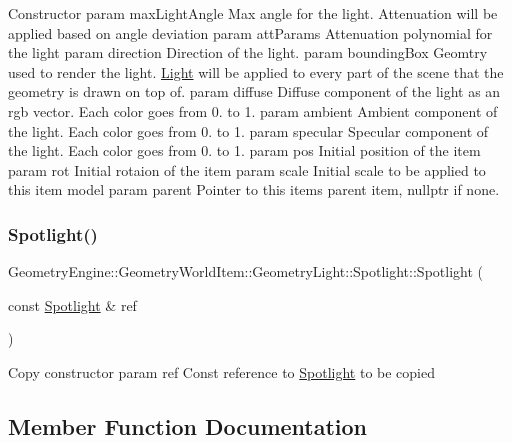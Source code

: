 Constructor param max\+Light\+Angle Max angle for the light. Attenuation will be applied based on angle deviation param att\+Params Attenuation polynomial for the light param direction Direction of the light. param bounding\+Box Geomtry used to render the light. \mbox{\hyperlink{class_geometry_engine_1_1_geometry_world_item_1_1_geometry_light_1_1_light}{Light}} will be applied to every part of the scene that the geometry is drawn on top of. param diffuse Diffuse component of the light as an rgb vector. Each color goes from 0. to 1. param ambient Ambient component of the light. Each color goes from 0. to 1. param specular Specular component of the light. Each color goes from 0. to 1. param pos Initial position of the item param rot Initial rotaion of the item param scale Initial scale to be applied to this item model param parent Pointer to this items parent item, nullptr if none. \mbox{\label{class_geometry_engine_1_1_geometry_world_item_1_1_geometry_light_1_1_spotlight_a9d503c8da14980a0e7df3c9c0edde42c}} 
\subsubsection{\texorpdfstring{Spotlight()}{Spotlight()}\hspace{0.1cm}{\footnotesize\ttfamily [2/2]}}
{\footnotesize\ttfamily Geometry\+Engine\+::\+Geometry\+World\+Item\+::\+Geometry\+Light\+::\+Spotlight\+::\+Spotlight (\begin{DoxyParamCaption}\item[{const \mbox{\hyperlink{class_geometry_engine_1_1_geometry_world_item_1_1_geometry_light_1_1_spotlight}{Spotlight}} \&}]{ref }\end{DoxyParamCaption})\hspace{0.3cm}{\ttfamily [inline]}}

Copy constructor param ref Const reference to \mbox{\hyperlink{class_geometry_engine_1_1_geometry_world_item_1_1_geometry_light_1_1_spotlight}{Spotlight}} to be copied 

\subsection{Member Function Documentation}
\mbox{\label{class_geometry_engine_1_1_geometry_world_item_1_1_geometry_light_1_1_spotlight_a6136ca2338a7b5f5be70ccab82fe655e}} 
